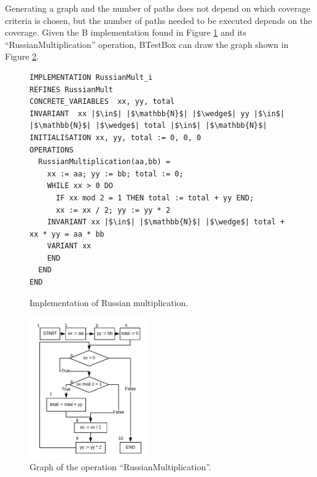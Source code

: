 \documentclass[runningheads]{llncs}
\begin{document}
Generating a graph and the number of paths does not depend on which coverage criteria is chosen, but the number of paths needed to be executed depends on the coverage. Given the B implementation found in Figure \ref{fig:russianMultImp} and its ``RussianMultiplication'' operation, BTestBox can draw the graph shown in Figure \ref{fig:russianMultGraph}.

\begin{figure}[ht]
        \centering
        \begin{minipage}{0.45\textwidth}
            \centering
        
            \begin{verbatim}
IMPLEMENTATION RussianMult_i
REFINES RussianMult
CONCRETE_VARIABLES  xx, yy, total
INVARIANT  xx |$\in$| |$\mathbb{N}$| |$\wedge$| yy |$\in$| |$\mathbb{N}$| |$\wedge$| total |$\in$| |$\mathbb{N}$|
INITIALISATION xx, yy, total := 0, 0, 0
OPERATIONS
  RussianMultiplication(aa,bb) = 
    xx := aa; yy := bb; total := 0;
    WHILE xx > 0 DO
      IF xx mod 2 = 1 THEN total := total + yy END;
      xx := xx / 2; yy := yy * 2
    INVARIANT xx |$\in$| |$\mathbb{N}$| |$\wedge$| total + xx * yy = aa * bb
    VARIANT xx
    END
  END
END
                \end{verbatim}
        \caption{Implementation of Russian multiplication. \cite{schneider2001b}}
        \label{fig:russianMultImp}
    \end{minipage}%
\end{figure}

\begin{figure}[ht]
\centering
\includegraphics[width=0.45\textwidth]{imagens/lacoGrafo.png}
\caption{Graph of the operation ``RussianMultiplication''.}
\label{fig:russianMultGraph}
\end{figure}
\end{document}
